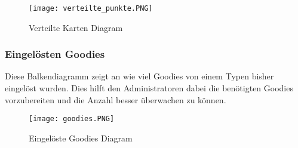 				\begin{figure}[h]
					\centering
					\texttt{[image: verteilte\_punkte.PNG]}
					\caption{Verteilte Karten Diagram}
				\end{figure}

			\subsubsection{Eingelösten Goodies}
				Diese Balkendiagramm zeigt an wie viel Goodies von einem Typen bisher eingelöst wurden. Dies hilft den Administratoren dabei die benötigten Goodies vorzubereiten und die Anzahl besser überwachen zu können. 

				\begin{figure}[h]
					\centering
					\texttt{[image: goodies.PNG]}
					\caption{Eingelöste Goodies Diagram}
				\end{figure}
